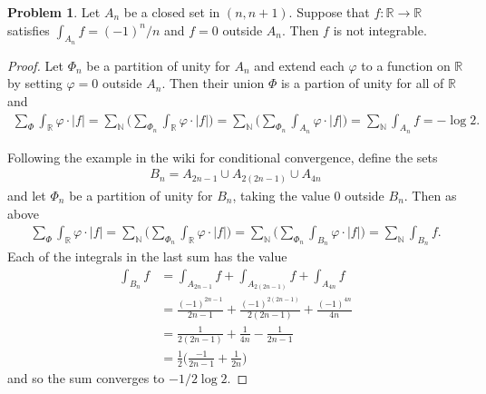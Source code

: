 \documentclass[20pt]{article}
\theoremstyle{plain}
\theoremstyle{definition}
\newtheorem*{problem}{Problem}
\newcommand{\reals}{\mathbb{R}}
\newcommand{\naturals}{\mathbb{N}}
\begin{document}
\begin{problem}{3.38}
  Let $A_n$ be a closed set in $(n, n+1)$. Suppose that $f: \reals \to \reals$
  satisfies $\int_{A_n}f = (-1)^n/n$ and $f=0$ outside $A_n.$
  Then $f$ is not integrable.
\end{problem}

\begin{proof}
  Let $\Phi_n$ be a partition of unity for $A_n$ and extend each
  $\varphi$ to a function on $\mathbb{R}$ by setting $\varphi=0$ outside
  $A_n$.
  Then their union $\Phi$ is a partion of unity for all of $\mathbb{R}$
  and
  \begin{align*}
    \sum_\Phi \int_\mathbb{R} \varphi \cdot |f| =
    \sum_\naturals \bigg( \sum_{\Phi_n} \int_\reals \varphi \cdot |f| \bigg) =
    \sum_\naturals \bigg( \sum_{\Phi_n} \int_{A_n} \varphi \cdot |f| \bigg) =
    \sum_\naturals \int_{A_n}f = -\log 2.
  \end{align*}

  Following the example in the wiki for conditional convergence,
  define the sets
  \begin{align*}
    B_n = A_{2n - 1} \cup A_{2(2n-1)} \cup A_{4n}
  \end{align*}
  and let $\Phi_n$ be a partition of unity for $B_n$, taking the
  value $0$ outside $B_n$.  Then as above
  \begin{align*}
    \sum_\Phi \int_\reals \varphi \cdot |f| =
    \sum_\naturals \bigg(\sum_{\Phi_n} \int_\reals \varphi \cdot |f| \bigg) =
    \sum_\naturals \bigg(\sum_{\Phi_n} \int_{B_n} \varphi \cdot |f| \bigg) =
    \sum_\naturals \int_{B_n}f.
  \end{align*}
  Each of the integrals in the last sum has the value
  \begin{align*}
    \int_{B_n}f
    &= \int_{A_{2n-1}}f + \int_{A_{2(2n-1)}}f + \int_{A_{4n}}f \\
    &=  \frac{(-1)^{2n-1}}{2n-1} +
        \frac{(-1)^{2(2n-1)}}{2(2n-1)} +
        \frac{(-1)^{4n}}{4n} \\
    &=  \frac{1}{2(2n-1)} +
        \frac{1}{4n} -
        \frac{1}{2n-1} \\
    &= \frac{1}{2} \bigg(
     \frac{-1}{2n-1} + \frac{1}{2n} \bigg)
  \end{align*}
  and so the sum converges to $-1/2 \log 2.$
\end{proof}
\end{document}
